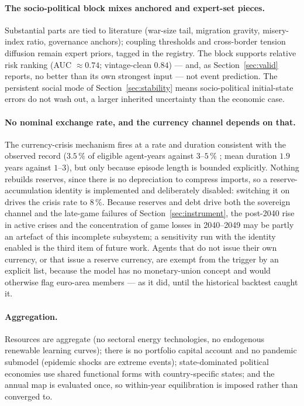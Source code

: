 \documentclass[12pt,a4paper]{article}
\begin{document}
\paragraph{The socio-political block mixes anchored and expert-set pieces.} Substantial parts
are tied to literature (war-size tail, migration gravity, misery-index ratio, governance
anchors); coupling thresholds and cross-border tension diffusion remain expert priors, tagged
in the registry. The block supports relative risk ranking (AUC ${\approx}0.74$; vintage-clean
$0.84$) --- and, as Section~\ref{sec:valid} reports, no better than its own strongest input ---
not event prediction. The persistent social mode of Section~\ref{sec:stability} means
socio-political initial-state errors do not wash out, a larger inherited uncertainty than the
economic case.

\paragraph{No nominal exchange rate, and the currency channel depends on that.} The
currency-crisis mechanism fires at a rate and duration consistent with the observed record
($3.5\,\%$ of eligible agent-years against $3$--$5\,\%$ \citep{laeven2020}; mean duration $1.9$
years against $1$--$3$), but only because episode length is bounded explicitly. Nothing rebuilds
reserves, since there is no depreciation to compress imports, so a reserve-accumulation
identity is implemented and deliberately disabled: switching it on drives the crisis rate to
$8\,\%$. Because reserves and debt drive both the sovereign channel and the late-game failures
of Section~\ref{sec:instrument}, the post-2040 rise in active crises and the concentration of
game losses in 2040--2049 may be partly an artefact of this incomplete subsystem; a sensitivity
run with the identity enabled is the third item of future work. Agents that do not issue their
own currency, or that issue a reserve currency, are exempt from the trigger by an explicit
list, because the model has no monetary-union concept and would otherwise flag euro-area
members --- as it did, until the historical backtest caught it.

\paragraph{Aggregation.} Resources are aggregate (no sectoral energy technologies, no
endogenous renewable learning curves); there is no portfolio capital account and no pandemic
submodel (epidemic shocks are extreme events); state-dominated political economies use shared
functional forms with country-specific states; and the annual map is evaluated once, so
within-year equilibration is imposed rather than converged to.
\end{document}

